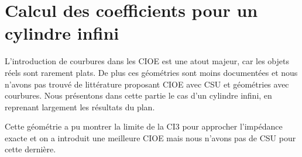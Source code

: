 \chapter{Calcul des coefficients pour un cylindre infini}
\label{sec:cylindre}
\minitoc
\newpage
{}
L'introduction de courbures dans les CIOE est une atout majeur, car les objets réels sont rarement plats. De plus ces géométries sont moins documentées et nous n'avons pas trouvé de littérature proposant CIOE avec CSU et géométries avec courbures. Nous présentons dans cette partie le cas d'un cylindre infini, en reprenant largement les résultats du plan.







Cette géométrie a pu montrer la limite de la CI3 pour approcher l'impédance exacte et on a introduit une meilleure CIOE mais nous n'avons pas de CSU pour cette dernière. 
